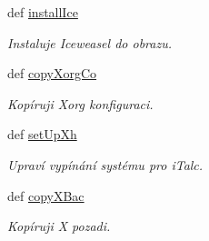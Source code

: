 \begin{DoxyCompactItemize}
def \hyperlink{classConfSys_1_1ConfSys_a75c24373b7f98875cb36979db32affb6}{install\-Ice}
\begin{DoxyCompactList}\small\item\em Instaluje Iceweasel do obrazu. \end{DoxyCompactList}\item 
def \hyperlink{classConfSys_1_1ConfSys_ac1ae7ecf353bc1fd45635bdca5d7b3bc}{copy\-Xorg\-Co}
\begin{DoxyCompactList}\small\item\em Kopíruji Xorg konfiguraci. \end{DoxyCompactList}\item 
def \hyperlink{classConfSys_1_1ConfSys_a9f6f935bb49c6cbdf8dab640c0b9b33f}{set\-Up\-Xh}
\begin{DoxyCompactList}\small\item\em Upraví vypínání systému pro i\-Talc. \end{DoxyCompactList}\item 
def \hyperlink{classConfSys_1_1ConfSys_a56c578bb874bfb2b0b3da19361ddf84b}{copy\-X\-Bac}
\begin{DoxyCompactList}\small\item\em Kopíruji X pozadi. \end{DoxyCompactList}\end{DoxyCompactItemize}
